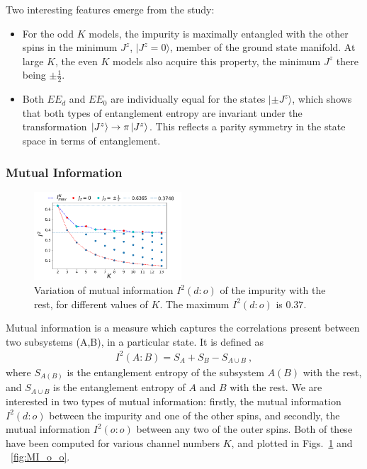 \documentclass[reprint,prb,superscriptaddress]{revtex4-2}
\begin{document}
Two interesting features emerge from the study:
\begin{itemize}
	\item For the odd \(K\) models, the impurity is maximally entangled with the other spins in the minimum \(J^z\), $|J^z=0\rangle$, member of the ground state manifold.
	At large \(K\), the even \(K\) models also acquire this property, the minimum \(J^z\) there being \(\pm \frac{1}{2}\).
	\item 
	Both \(EE_d\) and \(EE_0\) are individually equal for the states $|\pm J^z\rangle$, which shows that both types of entanglement entropy are invariant under the transformation \(\ket{J^z} \to \pi \ket{J^z}\). This reflects a parity symmetry in the state space in terms of entanglement.
\end{itemize}

\subsubsection{Mutual Information}

\begin{figure}[!htpb]
\includegraphics[width=0.49\textwidth]{NEW31DecI2vsNch01}
\caption{Variation of mutual information $I^2(d:o)$ of the impurity with the rest, for different values of $K$. The maximum $I^2(d:o)$ is $0.37$.}
\label{fig:MI_d_o}
\end{figure}

Mutual information is a measure which captures the correlations present between two subsystems (A,B), in a particular state. It is defined as
\begin{eqnarray}
I^2(A:B)=S_A+S_B-S_{A\cup B}~,
\end{eqnarray}
where $S_{A(B)}$ is the entanglement entropy of the subsystem $A(B)$ with the rest, and \(S_{A\cup B}\) is the entanglement entropy of \(A\) and \(B\) with the rest.
We are interested in two types of mutual information: firstly, the mutual information $I^2(d:o)$ between the impurity and one of the other spins, and secondly, the mutual information $I^2(o:o)$ between any two of the outer spins.
Both of these have been computed for various channel numbers \(K\), and plotted in Figs.~\ref{fig:MI_d_o} and ~\ref{fig:MI_o_o}.
\end{document}
